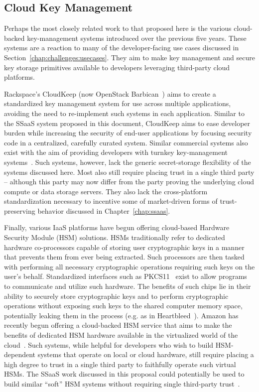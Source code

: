 \subsection{Cloud Key Management}

Perhaps the most closely related work to that proposed here is the
various cloud-backed key-management systems introduced over the
previous five years. These systems are a reaction to many of the
developer-facing use cases discussed in
Section~\ref{chap:challenges:usecases}. They aim to make key
management and secure key storage primitives available to developers
leveraging third-party cloud platforms.

Rackspace's CloudKeep\cite{cloudkeep-presentation, cloudkeep} (now
OpenStack Barbican~\cite{openstack-barbican}) aims to create a
standardized key management system for use across multiple
applications, avoiding the need to re-implement such systems in each
application. Similar to the SSaaS system proposed in this document,
CloudKeep aims to ease developer burden while increasing the security
of end-user applications by focusing security code in a centralized,
carefully curated system. Similar commercial systems also exist with
the aim of providing developers with turnkey key-management
systems~\cite{gazzang, porticor, rosen2012}. Such systems, however,
lack the generic secret-storage flexibility of the systems discussed
here. Most also still require placing trust in a single third party --
although this party may now differ from the party proving the
underlying cloud compute or data storage servers. They also lack the
cross-platform standardization necessary to incentive some of
market-driven forms of trust-preserving behavior discussed in
Chapter~\ref{chap:ssaas}.

Finally, various IaaS platforms have begun offering cloud-based
Hardware Security Module (HSM) solutions. HSMs traditionally refer to
dedicated hardware co-processors capable of storing user cryptographic
keys in a manner that prevents them from ever being extracted. Such
processors are then tasked with performing all necessary cryptographic
operations requiring such keys on the user's behalf. Standardized
interfaces such as PKCS11~\cite{pcks11-standard} exist to allow
programs to communicate and utilize such hardware. The benefits of
such chips lie in their ability to securely store cryptographic keys
and to perform cryptographic operations without exposing such keys to
the shared computer memory space, potentially leaking them in the
process (e.g. as in Heartbleed~\cite{heartbleed}). Amazon has recently
begun offering a cloud-backed HSM service that aims to make the
benefits of dedicated HSM hardware available in the virtualized world
of the cloud~\cite{amazon-hsm}. Such systems, while helpful for
developers who wish to build HSM-dependent systems that operate on
local or cloud hardware, still require placing a high degree to trust
in a single third party to faithfully operate such virtual HSMs. The
SSaaS work discussed in this proposal could potentially be used to
build similar ``soft'' HSM systems without requiring single
third-party trust~\cite{lorier-pkcs11}.

